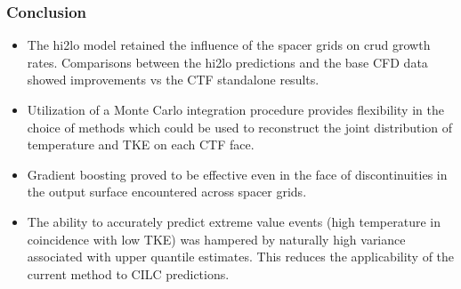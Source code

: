 \documentclass[t, pdftex]{beamer}
\begin{document}
\begin{frame}
\frametitle{Conclusion}
\vspace{-16pt}
\begin{itemize}
    \item The hi2lo model retained the influence of the spacer grids on crud growth rates.  Comparisons between the hi2lo predictions and the base CFD data showed improvements vs the CTF standalone results.
    \item Utilization of a Monte Carlo integration procedure provides flexibility in the choice of methods which could be used to reconstruct the joint distribution of temperature and TKE on each CTF face.  
    \item Gradient boosting proved to be effective even in the face of discontinuities in the output surface encountered across spacer grids.    
    \item The ability to accurately predict extreme value events (high temperature in coincidence with low TKE) was hampered by naturally high variance associated with upper quantile estimates.  This reduces the applicability of the current method to CILC predictions.
\end{itemize}
\end{frame}
\end{document}

